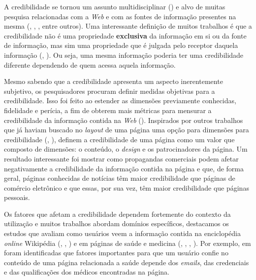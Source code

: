 A credibilidade se tornou um assunto multidisciplinar (\cite{Rieh07}) e alvo de muitas pesquisa relacionadas com a \textit{Web} e com as fontes de informação presentes na mesma (\cite{Sundar99}, \cite{Freeman04}, \cite{Flanagin07}, entre outros).
Uma interessante definição de muitos trabalhos é que a credibilidade não é uma propriedade \textbf{exclusiva} da informação em si ou da fonte de informação, mas sim uma propriedade que é julgada pelo receptor daquela informação (\cite{Sundar99}, \cite{Freeman04}). Ou seja, uma mesma informação poderia ter uma credibilidade diferente dependendo de quem acessa aquela informação.

Mesmo sabendo que a credibilidade apresenta um aspecto inerentemente subjetivo, os pesquisadores procuram definir medidas objetivas para a credibilidade. Isso foi feito ao estender as dimensões previamente conhecidas, fidelidade e perícia, a fim de obterem mais métricas para mensurar a credibilidade da informação contida na \textit{Web} (\cite{Flanagin07}). 
Inspirados por outros trabalhos que já haviam buscado no \textit{layout} de uma página uma opção para dimensões para credibilidade
 (\cite{Palmer00}, \cite{Fogg01}), \cite{Flanagin07} definem a credibilidade de uma página como um valor que composto de dimensões: o conteúdo, o \textit{design} e os patrocinadores da página. Um resultado interessante foi mostrar como propagandas comerciais podem afetar negativamente a credibilidade da informação contida na página e que, de forma geral, páginas conhecidas de notícias têm maior credibilidade que páginas de comércio eletrônico e que essas, por sua vez, têm maior credibilidade que páginas pessoais.

Os fatores que afetam a credibilidade dependem fortemente do contexto da utilização e muitos trabalhos abordam domínios específicos,
destacamos os estudos que avaliam como usuários veem a informação contida na enciclopédia \textit{online} Wikipédia (\cite{Chesney06}, \cite{Lopes08}, \cite{Kubiszewski11}) e em páginas de saúde e medicina (\cite{Linderg98}, \cite{Eastin01}, \cite{Eysenbach02}, \cite{Rains09}). Por exemplo, em \cite{Eysenbach02} 
foram identificadas que fatores importantes para que um usuário confie no conteúdo de uma página relacionada a saúde depende dos \textit{emails}, das credenciais e das qualificações dos médicos encontradas na página.

